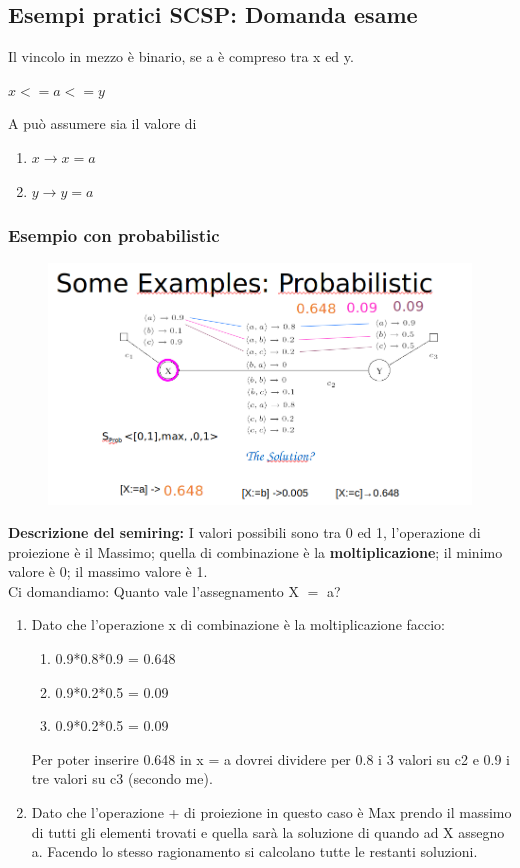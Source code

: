 \subsection{Esempi pratici SCSP: Domanda esame}
Il vincolo in mezzo è binario, se a è compreso tra x ed y.
\begin{center}
$x <= a <= y$     
\end{center}
A può assumere sia il valore di 
\begin{enumerate}
    \item $x \rightarrow x = a$
    \item $y \rightarrow y = a$
\end{enumerate}
\subsubsection{Esempio con probabilistic}
\begin{figure}[htp]
	\centering
    \includegraphics[width=14cm, keepaspectratio]{img/Cap4/probabilistic2.png}
\end{figure}
\noindent \textbf{Descrizione del semiring:} I valori possibili sono tra 0 ed 1, l’operazione
di proiezione è il Massimo; quella di combinazione è la \textbf{moltiplicazione}; il minimo valore è 0; il massimo valore è 1. 
\\Ci domandiamo: Quanto vale l’assegnamento X $=$ a?
\begin{enumerate}
    \item Dato che l’operazione x di combinazione è la moltiplicazione faccio:
    \begin{enumerate}
        \item 0.9*0.8*0.9 = 0.648
        \item 0.9*0.2*0.5 = 0.09
        \item 0.9*0.2*0.5 = 0.09
    \end{enumerate}
    Per poter inserire 0.648 in x = a dovrei dividere per 0.8 i 3 valori su c2 e 0.9 i tre valori su c3 (secondo me).
    \item Dato che l’operazione + di proiezione in questo caso è Max prendo il massimo di tutti gli elementi trovati e quella sarà la soluzione di quando ad X assegno a.
    Facendo lo stesso ragionamento si calcolano tutte le restanti soluzioni.
\end{enumerate}

